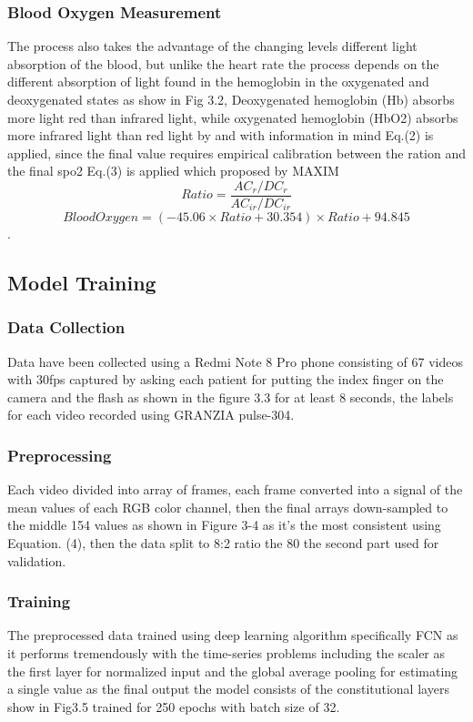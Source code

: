 \documentclass{bmcart}
\begin{document}
\subsubsection*{Blood Oxygen Measurement}
The process also takes the advantage of  the changing levels different light
absorption of the blood, but unlike the heart rate the process depends on the
different absorption of light found in the hemoglobin in the oxygenated and
deoxygenated states as show in Fig 3.2, Deoxygenated hemoglobin (Hb) absorbs
more light red than infrared light, while oxygenated hemoglobin (HbO2) absorbs
more infrared light than red light by and with information in mind Eq.(2) is
applied, since the final value requires empirical calibration between the ration
and the final spo2 Eq.(3) is applied which proposed by MAXIM%
%
\[
 Ratio = \frac{AC_r/DC_r}{AC_{ir}/DC_{ir}}
\]
\[
 Blood Oxygen = (-45.06 \times Ratio + 30.354) \times Ratio + 94.845
\]
%
\cite{koon,khar,zvai,xjon,marg}.

\subsection*{Model Training}
\subsubsection*{Data Collection}
Data have been collected using a Redmi Note 8 Pro phone consisting of 67 videos
with 30fps captured by asking each patient for putting the index finger on the
camera and the flash as shown in the figure 3.3 for at least 8 seconds, the
labels for each video recorded using GRANZIA pulse-304.
\subsubsection*{Preprocessing}
Each video divided into array of frames, each frame converted into a signal of
the mean values of each RGB color channel, then the final arrays down-sampled to
the middle 154 values as shown in Figure 3-4 as it’s the most consistent using
Equation. (4), then the data split to 8:2 ratio the 80%
the second part used for validation.
\subsubsection*{Training}
The preprocessed data trained using deep learning algorithm specifically FCN as
it performs tremendously with the time-series problems including the scaler as
the first layer for normalized input and the global average pooling for
estimating a single value as the final output the model consists of the
constitutional layers show in Fig3.5 trained for 250 epochs with batch size of
32.
\end{document}

